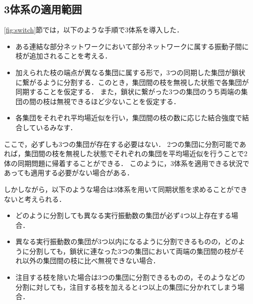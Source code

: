 \documentclass[../main]{subfiles}
\begin{document}
\subsection{3体系の適用範囲}
\ref{fig:switch}節では，以下のような手順で3体系を導入した．
\begin{itemize}
    \item ある連結な部分ネットワークにおいて部分ネットワークに属する振動子間に枝が追加されることを考える．
    \item 加えられた枝の端点が異なる集団に属する形で，3つの同期した集団が鎖状に繋がるように分割する．このとき，集団間の枝を無視した状態で各集団が同期することを仮定する．
    また，鎖状に繋がった3つの集団のうち両端の集団の間の枝は無視できるほど少ないことを仮定する．
    \item 各集団をそれぞれ平均場近似を行い，集団間の枝の数に応じた結合強度で結合しているみなす．
\end{itemize}
ここで，必ずしも3つの集団が存在する必要はない．
2つの集団に分割可能であれば，集団間の枝を無視した状態でそれぞれの集団を平均場近似を行うことで2体の同期問題に帰着することができる．
このように，3体系を適用できる状況であっても適用する必要がない場合がある．

しかしながら，以下のような場合は3体系を用いて同期状態を求めることができないと考えられる．
\begin{itemize}
    \item 
    どのように分割しても異なる実行振動数の集団が必ず4つ以上存在する場合．
    \item
    異なる実行振動数の集団が3つ以内になるように分割できるものの，どのように分割しても，鎖状に連なった3つの集団において両端の集団間の枝がそれ以外の集団間の枝に比べ無視できない場合．
    \item
    注目する枝を除いた場合は3つの集団に分割できるものの，そのようなどの分割に対しても，注目する枝を加えると4つ以上の集団に分かれてしまう場合．
\end{itemize}
\end{document}
